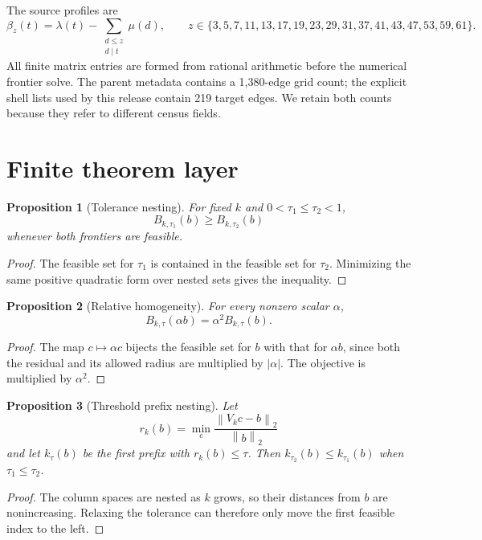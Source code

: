 \documentclass[11pt]{article}
\newtheorem{proposition}{Proposition}
\newcommand{\norm}[1]{\left\lVert #1\right\rVert}
\begin{document}
The source profiles are
\[
 \beta_z(t)=\lambda(t)-
 \sum_{\substack{d\leq z\\d\mid t}}\mu(d),\qquad
 z\in\{3,5,7,11,13,17,19,23,29,31,37,41,43,47,53,59,61\}. \tag{2}
\]
All finite matrix entries are formed from rational arithmetic before the
numerical frontier solve.  The parent metadata contains a 1,380-edge grid
count; the explicit shell lists used by this release contain 219 target
edges.  We retain both counts because they refer to different census
fields.

\section{Finite theorem layer}

\begin{proposition}[Tolerance nesting]
For fixed $k$ and $0<\tau_1\leq\tau_2<1$,
\[
 B_{k,\tau_1}(b)\geq B_{k,\tau_2}(b)
\]
whenever both frontiers are feasible.
\end{proposition}

\begin{proof}
The feasible set for $\tau_1$ is contained in the feasible set for
$\tau_2$.  Minimizing the same positive quadratic form over nested sets
gives the inequality.
\end{proof}

\begin{proposition}[Relative homogeneity]
For every nonzero scalar $\alpha$,
\[
 B_{k,\tau}(\alpha b)=\alpha^2B_{k,\tau}(b).
\]
\end{proposition}

\begin{proof}
The map $c\mapsto\alpha c$ bijects the feasible set for $b$ with that for
$\alpha b$, since both the residual and its allowed radius are multiplied
by $\lvert\alpha\rvert$.  The objective is multiplied by $\alpha^2$.
\end{proof}

\begin{proposition}[Threshold prefix nesting]
Let
\[
 r_k(b)=\min_c\frac{\norm{V_kc-b}_2}{\norm b_2}
\]
and let $k_\tau(b)$ be the first prefix with $r_k(b)\leq\tau$.  Then
$k_{\tau_2}(b)\leq k_{\tau_1}(b)$ when $\tau_1\leq\tau_2$.
\end{proposition}

\begin{proof}
The column spaces are nested as $k$ grows, so their distances from $b$ are
nonincreasing.  Relaxing the tolerance can therefore only move the first
feasible index to the left.
\end{proof}
\end{document}
